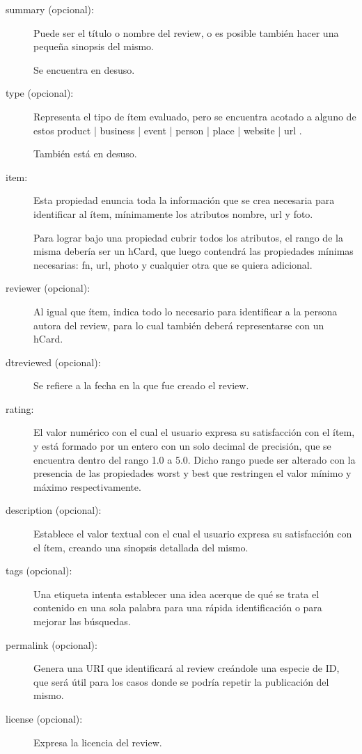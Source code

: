 \begin{description}
\item [summary (opcional):] Puede ser el título o nombre del review, o es posible también hacer una pequeña sinopsis del mismo. 

Se encuentra en desuso.

\item [type (opcional):] Representa el tipo de ítem evaluado, pero se encuentra acotado a alguno de estos  product | business | event | person | place | website | url .

También está en desuso.

\item [item:] Esta propiedad enuncia toda la información que se crea necesaria para identificar al ítem, mínimamente los atributos nombre, url y foto.

Para lograr bajo una propiedad cubrir todos los atributos, el rango de la misma debería ser un hCard, que luego contendrá las propiedades mínimas necesarias: 
fn, url, photo y cualquier otra que se quiera adicional.

\item [reviewer (opcional):] Al igual que ítem, indica todo lo necesario para identificar a la persona autora del review, para lo cual también deberá representarse 
con un hCard. 

\item [dtreviewed (opcional):] Se refiere a la fecha en la que fue creado el review. 

\item [rating:] El valor numérico con el cual el usuario expresa su satisfacción con el ítem, y está formado por un entero con un solo decimal 
de precisión, que se encuentra dentro del rango 1.0 a 5.0. Dicho rango puede ser alterado con la presencia de las propiedades worst y best 
que restringen el valor mínimo y máximo respectivamente.

\item [description (opcional):] Establece el valor textual con el cual el usuario expresa su satisfacción con el ítem, creando una 
sinopsis detallada del mismo. 

\item [tags (opcional):] Una etiqueta intenta establecer una idea acerque de qué se trata el contenido en una sola palabra para una rápida identificación 
o para mejorar las búsquedas. 

\item [permalink (opcional):] Genera una URI que identificará al review creándole una especie de ID, que será útil para los casos donde 
se podría repetir la publicación del mismo. 

\item [license (opcional):] Expresa la licencia del review.
\end{description}

